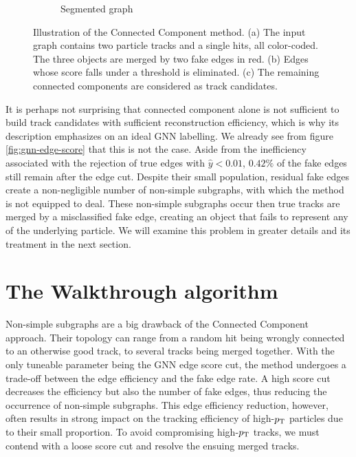 \begin{figure}[h!]
\begin{subfigure}[b]{0.33\textwidth}
    \vspace{0.5cm}
    \caption{Segmented graph}
    \label{subfig:gnn-segmented-graph}
\end{subfigure}
\caption{Illustration of the Connected Component method. (a) The input graph contains two particle tracks and a single hits, all color-coded. The three objects are merged by two fake edges in red. (b) Edges whose score falls under a threshold is eliminated. (c) The remaining connected components are considered as track candidates. }
\label{fig:connected-component}
\end{figure}

It is perhaps not surprising that connected component alone is not sufficient to build track candidates with sufficient reconstruction efficiency, 
which is why its description emphasizes on an ideal GNN labelling.
We already see from figure \ref{fig:gnn-edge-score} that this is not the case. 
Aside from the inefficiency associated with the rejection of true edges with $\hat{y}<0.01$, $0.42\%$ of the fake edges still remain after the edge cut. 
Despite their small population, residual fake edges create a non-negligible number of non-simple subgraphs, with which the method is not equipped to deal.
These non-simple subgraphs occur then true tracks are merged by a misclassified fake edge, creating an object that fails to represent any of the underlying particle.
We will examine this problem in greater details and its treatment in the next section.

\section{The Walkthrough algorithm}
\label{sect:walk}

Non-simple subgraphs are a big drawback of the Connected Component approach. 
Their topology can range from a random hit being wrongly connected to an otherwise good track, to several tracks being merged together. 
With the only tuneable parameter being the GNN edge score cut, the method undergoes a trade-off between the edge efficiency and the fake edge rate. 
A high score cut decreases the efficiency but also the number of fake edges, thus reducing the occurrence of non-simple subgraphs. 
This edge efficiency reduction, however, often results in strong impact on the tracking efficiency of high-$p_{\text{T}}$ particles due to their small proportion. 
To avoid compromising high-$p_{\text{T}}$ tracks, we must contend with a loose score cut and resolve the ensuing merged tracks.


